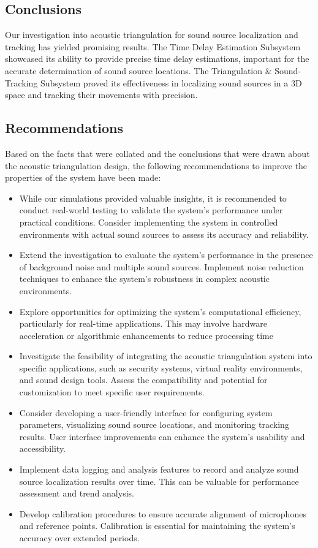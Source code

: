 \documentclass[a4paper,11pt]{article}
\begin{document}
\subsection*{Conclusions}

Our investigation into acoustic triangulation for sound source localization and tracking has yielded promising results. The Time Delay Estimation Subsystem showcased its ability to provide precise time delay estimations, important for the accurate determination of sound source locations. The Triangulation \& Sound-Tracking Subsystem proved its effectiveness in localizing sound sources in a 3D space and tracking their movements with precision.

\subsection*{Recommendations}

Based on the facts that were collated and the conclusions that were drawn about the acoustic triangulation design, the following recommendations to improve the properties of the system have been made:

\begin{itemize}
	\item
	While our simulations provided valuable insights, it is recommended to conduct real-world testing to validate the system's performance under practical conditions. Consider implementing the system in controlled environments with actual sound sources to assess its accuracy and reliability.
	\item 
	Extend the investigation to evaluate the system's performance in the presence of background noise and multiple sound sources. Implement noise reduction techniques to enhance the system's robustness in complex acoustic environments.
	\item 
	Explore opportunities for optimizing the system's computational efficiency, particularly for real-time applications. This may involve hardware acceleration or algorithmic enhancements to reduce processing time
	\item 
	Investigate the feasibility of integrating the acoustic triangulation system into specific applications, such as security systems, virtual reality environments, and sound design tools. Assess the compatibility and potential for customization to meet specific user requirements.
	\item 
	Consider developing a user-friendly interface for configuring system parameters, visualizing sound source locations, and monitoring tracking results. User interface improvements can enhance the system's usability and accessibility.
	\item 
	Implement data logging and analysis features to record and analyze sound source localization results over time. This can be valuable for performance assessment and trend analysis.
	\item
	Develop calibration procedures to ensure accurate alignment of microphones and reference points. Calibration is essential for maintaining the system's accuracy over extended periods.
\end{itemize}
\printglossaries
\end{document}
